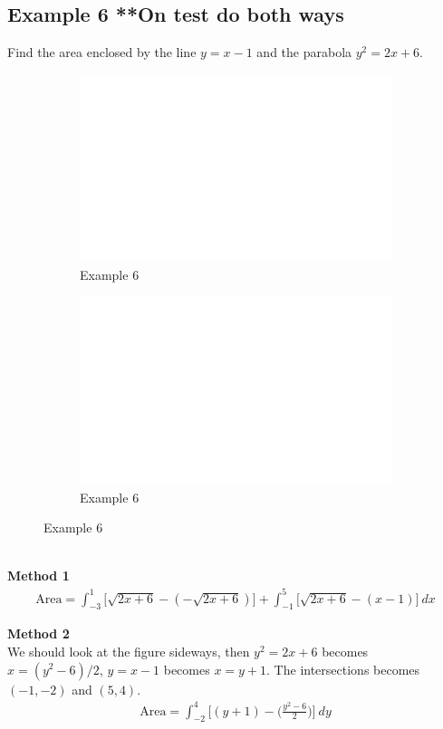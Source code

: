 \documentclass[11pt]{article}
\begin{document}
\subsection{Example 6 **On test do both ways}
Find the area enclosed by the line $ y=x-1 $ and the parabola $ y^2=2x+6 $.
\begin{figure}[h]
    \begin{subfigure}[h]{0.5\textwidth}
        \centering
        \includegraphics[scale=0.5]{fig_6_6_1.png}
        \caption{Example 6}
        \label{Label}
    \end{subfigure}
    \begin{subfigure}[h]{0.5\textwidth}
        \centering
        \includegraphics[scale=0.5]{fig_6_6_2.png}
        \caption{Example 6}
    \end{subfigure}
\end{figure}
\\[8pt]
\textbf{Method 1}
\begin{align*}
    \text{Area} = \int_{-3}^{1}\big[\sqrt{2x+6} - (-\sqrt{2x+6})\big] + \int_{-1}^{5}\big[\sqrt{2x+6} - (x-1)\big]\ dx
\end{align*}

\noindent
\textbf{Method 2}\\
We should look at the figure sideways, then $ y^2 = 2x+6 $ becomes $ x=(y^2-6)/2 $, $ y=x-1 $ becomes $ x=y+1 $. The intersections becomes $ (-1, -2) $ and $ (5,4) $.
\begin{align*}
    \text{Area} = \int_{-2}^{4}\bigg[ (y+1) - \bigg( \frac{y^2 - 6}{2} \bigg) \bigg]\ dy
\end{align*}
\end{document}
